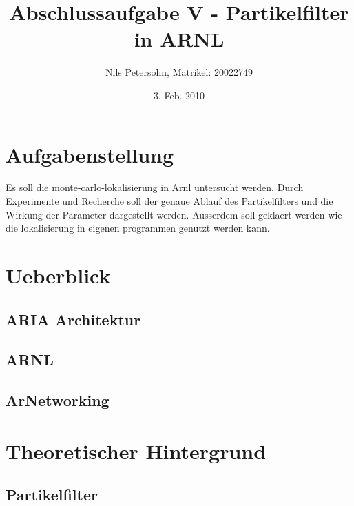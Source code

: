 \documentclass{article}
\title{Abschlussaufgabe V - Partikelfilter in ARNL}
\author{Nils Petersohn, Matrikel: 20022749}
\date{3. Feb. 2010}
\begin{document}
\maketitle



\section{Aufgabenstellung}
Es soll die monte-carlo-lokalisierung in Arnl untersucht werden. Durch Experimente und Recherche soll der genaue Ablauf des Partikelfilters und die Wirkung der Parameter dargestellt werden. Ausserdem soll geklaert werden wie die lokalisierung in eigenen programmen genutzt werden kann.


\section{Ueberblick}




\subsection{ARIA Architektur}
\subsection{ARNL}
\subsection{ArNetworking}




\section{Theoretischer Hintergrund}\label{previous work}

\subsection{Partikelfilter}







\end{document}
